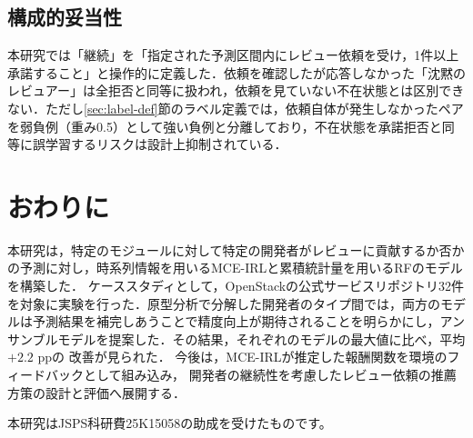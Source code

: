 \documentclass[submit,noauthor,ses,dvipdfmx]{ipsj}
\begin{document}
\subsection{構成的妥当性}
本研究では「継続」を「指定された予測区間内にレビュー依頼を受け，1件以上承諾すること」と操作的に定義した．依頼を確認したが応答しなかった「沈黙のレビュアー」は全拒否と同等に扱われ，依頼を見ていない不在状態とは区別できない．ただし\ref{sec:label-def}節のラベル定義では，依頼自体が発生しなかったペアを弱負例（重み0.5）として強い負例と分離しており，不在状態を承諾拒否と同等に誤学習するリスクは設計上抑制されている．

\section{おわりに}\label{sec:conclusion}
本研究は，特定のモジュールに対して特定の開発者がレビューに貢献するか否かの予測に対し，時系列情報を用いるMCE-IRLと累積統計量を用いるRFのモデルを構築した．
ケーススタディとして，OpenStackの公式サービスリポジトリ32件を対象に実験を行った．原型分析で分解した開発者のタイプ間では，両方のモデルは予測結果を補完しあうことで精度向上が期待されることを明らかにし，アンサンブルモデルを提案した．その結果，それぞれのモデルの最大値に比べ，平均$+2.2$ ppの
改善が見られた．
今後は，MCE-IRLが推定した報酬関数を環境のフィードバックとして組み込み，
開発者の継続性を考慮したレビュー依頼の推薦方策の設計と評価へ展開する．




\begin{acknowledgment}
本研究はJSPS科研費25K15058の助成を受けたものです。
\end{acknowledgment}



\end{document}
